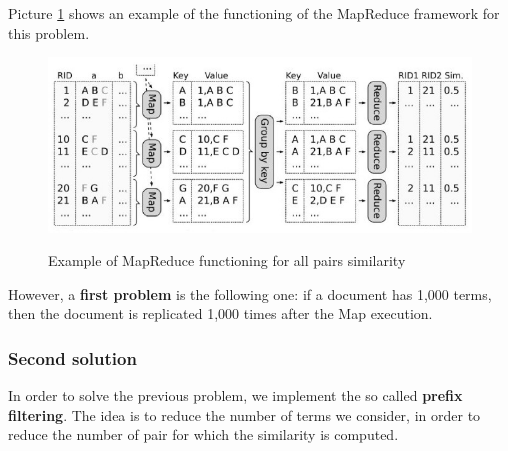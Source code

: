Picture \ref{mr ex} shows an example of the functioning of the MapReduce framework for this problem.

\begin{figure}[h!]
		\centering
		\includegraphics[scale = 2.0]{img/mr ex.jpg}
        \label{mr ex}
        \caption{Example of MapReduce functioning for all pairs similarity}
\end{figure}

However, a \textbf{first problem} is the following one: if a document has 1,000 terms, then the document is replicated 1,000 times after the Map execution.

\subsubsection{Second solution}
In order to solve the previous problem, we implement the so called \textbf{prefix filtering}. The idea is to reduce the number of terms we consider, in order to reduce the number of pair for which the similarity is computed.

